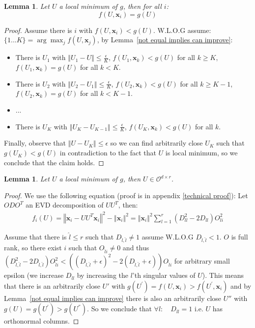 \documentclass{article}
\newtheorem{lemma}[theorem]{Lemma}
\newcommand{\Lemmaref}[1]{Lemma~\ref{#1}}
\newcommand{\x}{{\mathbf x}}
\begin{document}
\begin{lemma} \label{local minimum equals}
Let $U$ a local minimum of $g$, then for all $i$: 
$$f(U,\x_i)=g(U)$$
\end{lemma}
\begin{proof}
Assume there is $i$ with $f(U,\x_i)<g(U)$. W.L.O.G assume: $\{1...K\}=\arg\max_jf(U,\x_j)$, by \Lemmaref{not equal implies can improve}: 
\begin{itemize}
    \item There is $U_{1}$ with $\left\Vert U_{1}-U\right\Vert\le\frac{\epsilon}{K}$, $f(U_1,\x_k)<g(U)$ for all $k\ge K$, $f(U_1,\x_k)=g(U)$ for all $k< K$. 
    \item There is $U_{2}$ with $\left\Vert U_{2}-U_{1}\right\Vert\le\frac{\epsilon}{K}$, $f(U_2,\x_k)<g(U)$ for all $k\ge K-1$, $f(U_2,\x_k)=g(U)$ for all $k< K-1$.
    \item ...
    \item There is $U_{K}$ with $\left\Vert U_{K}-U_{K-1}\right\Vert\le\frac{\epsilon}{K}$, $f(U_K,\x_k)<g(U)$ for all $k$. 
\end{itemize}
Finally, observe that $\left\Vert U-U_{K}\right\Vert\le{\epsilon}$ so we can find arbitrarily close $U_K$ such that $g(U_{K})<g(U)$ in contradiction to the fact that $U$ is local minimum, so we conclude that the claim holds.
\end{proof}

\begin{lemma} \label{local minimum orthogonal}
Let $U$ a local minimum of $g$, then $U\in\mathcal{O}^{d\times r}$.
\end{lemma}

\begin{proof}
We use the following equation (proof is in appendix \ref{technical proof}): Let $ODO^{T}$ an EVD decomposition of $UU^{T}$, then:
\begin{align*}\label{}
    f_i(U)=\left\Vert\x_{i}-UU^{T}\x_{i}\right\Vert^{2} - \left\Vert\x_{i}\right\Vert^{2}=\left\Vert\x_{i}\right\Vert^{2}\sum_{l=1}^{r}(D_{ll}^{2}-2D_{ll})O_{li}^{2}
\end{align*}

Assume that there is $\hat{l}\le r$ such that ${D}_{\hat{l},\hat{l}}\ne1$ assume W.L.O.G ${D}_{\hat{l},\hat{l}}<1$. $O$ is full rank, so there exist $i$ such that $O_{\hat{l}i}\ne0$  and thus $({D}_{\hat{l},\hat{l}}^2-2{D}_{\hat{l},\hat{l}})O_{\hat{l}i}^{2}<(({D}_{\hat{l},\hat{l}}+\epsilon)^2-2({D}_{\hat{l},\hat{l}}+\epsilon))O_{\hat{l}i}$ for arbitrary small epsilon (we increase $D_{ll}$ by increasing the $l$'th singular values of $U$). This means that there is an arbitrarily close $U{'}$ with $g(U^{'})=f(U,\x_i)>f(U^{'},\x_i)$ and by \Lemmaref{not equal implies can improve} there is also an arbitrarily close $U{''}$ with $g({U})=g(U^{'})>g(U^{''})$. So we conclude that $\forall l: \quad D_{ll}=1$ i.e. $U$ has orthonormal columns. 
\end{proof}
\end{document}
